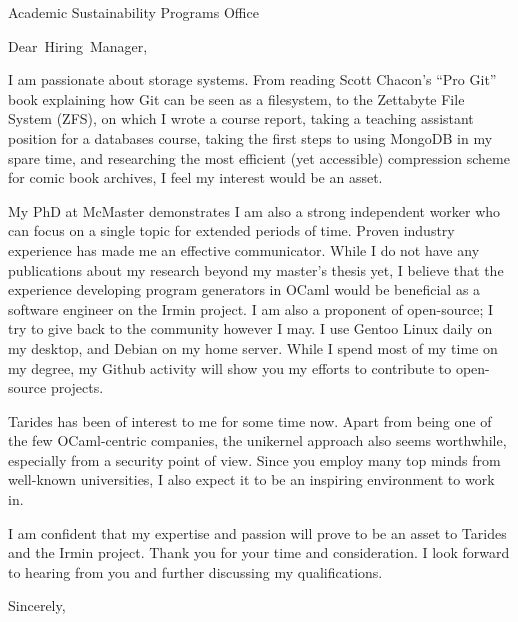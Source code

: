\documentclass[
fontsize=12pt,
paper=letter,
parskip=half,
enlargefirstpage=on,    %
fromalign=right,        %
fromphone=on,           %
fromemail=on,
fromrule=aftername,     %
addrfield=off,           %
backaddress=off,         %
subject=beforeopening,  %
locfield=narrow,        %
foldmarks=off,           %
]{scrlttr2}
\renewcommand{\\}{\ {\large\textperiodcentered}\ }
\begin{document}

\begin{letter}{Academic Sustainability Programs Office}


\opening{Dear~Hiring~Manager,}

I am passionate about storage systems.
From reading Scott Chacon's ``Pro Git'' book explaining how Git can be seen as a filesystem, to the Zettabyte File System (ZFS), on which I wrote a course report, taking a teaching assistant position for a databases course, taking the first steps to using MongoDB in my spare time, and researching the most efficient (yet accessible) compression scheme for comic book archives, I feel my interest would be an asset.

My PhD at McMaster demonstrates I am also a strong independent worker who can focus on a single topic for extended periods of time.
Proven industry experience has made me an effective communicator.
While I do not have any publications about my research beyond my master's thesis yet, I believe that the experience developing program generators in OCaml would be beneficial as a software engineer on the Irmin project.
I am also a proponent of open-source; I try to give back to the community however I may.
I use Gentoo Linux daily on my desktop, and Debian on my home server. While I spend most of my time on my degree, my Github activity will show you my efforts to contribute to open-source projects.

Tarides has been of interest to me for some time now.
Apart from being one of the few OCaml-centric companies, the unikernel approach also seems worthwhile, especially from a security point of view.
Since you employ many top minds from well-known universities, I also expect it to be an inspiring environment to work in.

I am confident that my expertise and passion will prove to be an asset to Tarides and the Irmin project.
Thank you for your time and consideration.
I look forward to hearing from you and further discussing my qualifications.
\closing{Sincerely,}


\end{letter}
\end{document}
